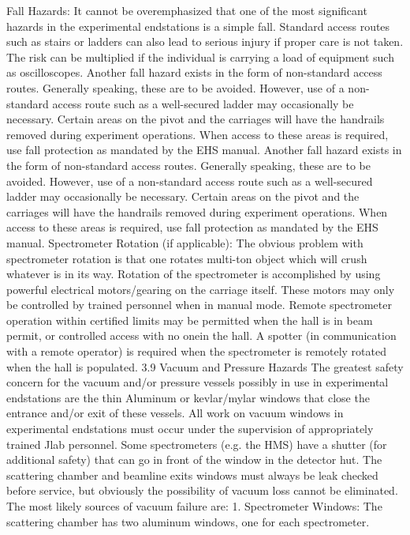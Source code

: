 {	Fall Hazards: It cannot be overemphasized that one of the most significant hazards in the experimental endstations is a simple fall. Standard access routes such as stairs or ladders can also lead to serious injury if proper care is not taken. The risk can be multiplied if the individual is carrying a load of equipment such as oscilloscopes. Another fall hazard exists in the form of non-standard access routes. Generally speaking, these are to be avoided. However, use of a non-standard access route such as a well-secured ladder may occasionally be necessary. Certain areas on the pivot and the carriages will have the handrails removed during experiment operations. When access to these areas is required, use fall protection as mandated by the EHS manual. Another fall hazard exists in the form of non-standard access routes. Generally speaking, these are to be avoided. However, use of a non-standard access route such as a well-secured ladder may occasionally be necessary. Certain areas on the pivot and the carriages will have the handrails removed during experiment operations. When access to these areas is required, use fall protection as mandated by the EHS manual.
	Spectrometer Rotation (if applicable): The obvious problem with spectrometer rotation is that one rotates multi-ton object which will crush whatever is in its way. Rotation of the spectrometer is accomplished by using powerful electrical motors/gearing on the carriage itself. These motors may only be controlled by trained personnel when in manual mode.  Remote spectrometer operation within certified limits may be permitted when the hall is in beam permit, or controlled access with no onein the hall.  A spotter (in communication with a remote operator) is required when the spectrometer is remotely rotated when the hall is populated.
3.9 		Vacuum and Pressure Hazards
	The greatest safety concern for the vacuum and/or pressure vessels possibly in use in experimental endstations are the thin Aluminum or kevlar/mylar windows that close the entrance and/or exit of these vessels. All work on vacuum windows in experimental endstations must occur under the supervision of appropriately trained Jlab personnel. Some spectrometers (e.g. the HMS) have a shutter (for additional safety) that can go in front of the window in the detector hut.  The scattering chamber and beamline exits windows must always be leak checked before service, but obviously the possibility of vacuum loss cannot be eliminated. The most likely sources of vacuum failure are:
	1.  	Spectrometer Windows: The scattering chamber has two aluminum windows, one for each spectrometer.
}
